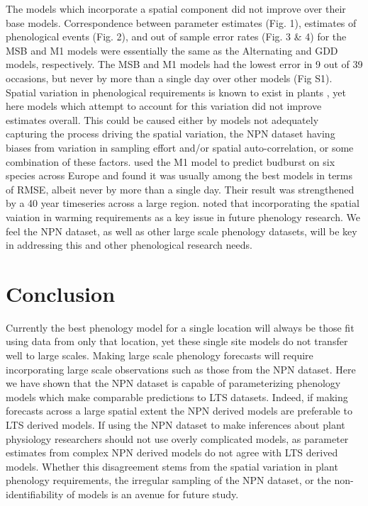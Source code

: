 \documentclass[fleqn,10pt,lineno]{wlpeerj} %
\begin{document}
The models which incorporate a spatial component did not improve over their base models. Correspondence between parameter estimates (Fig. 1), estimates of phenological events (Fig. 2), and out of sample error rates (Fig. 3 & 4) for the MSB and M1 models were essentially the same as the Alternating and GDD models, respectively. The MSB and M1 models had the lowest error in 9 out of 39 occasions, but never by more than a single day over other models (Fig S1). Spatial variation in phenological requirements is known to exist in plants \citep{zhang2017}, yet here models which attempt to account for this variation did not improve estimates overall. This could be caused either by models not adequately capturing the process driving the spatial variation, the NPN dataset having biases from variation in sampling effort and/or spatial auto-correlation, or some combination of these factors. \cite{basler2016} used the M1 model to predict budburst on six species across Europe and found it was usually among the best models in terms of RMSE, albeit never by more than a single day. Their result was strengthened by a 40 year timeseries across a large region. \cite{chuine2017} noted that incorporating the spatial vaiation in warming requirements as a key issue in future phenology research. We feel the NPN dataset, as well as other large scale phenology datasets, will be key in addressing this and other phenological research needs. 

\section*{Conclusion}

Currently the best phenology model for a single location will always be those fit using data from only that location, yet these single site models do not transfer well to large scales. Making large scale phenology forecasts will require incorporating large scale observations such as those from the NPN dataset. Here we have shown that the NPN dataset is capable of parameterizing phenology models which make comparable predictions to LTS datasets. Indeed, if making forecasts across a large spatial extent the NPN derived models are preferable to LTS derived models. If using the NPN dataset to make inferences about plant physiology researchers should not use overly complicated models, as parameter estimates from complex NPN derived models do not agree with LTS derived models. Whether this disagreement stems from the spatial variation in plant phenology requirements, the irregular sampling of the NPN dataset, or the non-identifiability of models is an avenue for future study. 
\end{document}
